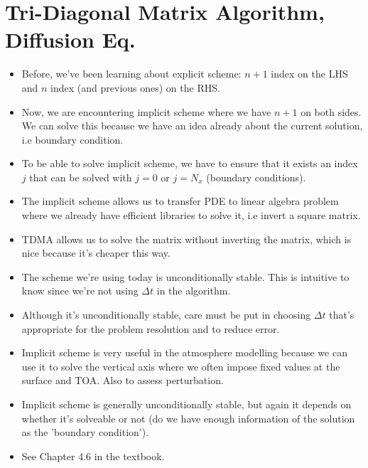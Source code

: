 \documentclass{article}
\begin{document}
\section{Tri-Diagonal Matrix Algorithm, Diffusion Eq.}
\begin{itemize}
    \item Before, we've been learning about explicit scheme: $n+1$ index on the LHS and $n$ index (and previous ones) on the RHS.
    \item Now, we are encountering implicit scheme where we have $n+1$ on both sides. We can solve this because we have an idea already about the current solution, i.e boundary condition.
    \item To be able to solve implicit scheme, we have to ensure that it exists an index $j$ that can be solved with $j=0$ or $j=N_x$ (boundary conditions).
    \item The implicit scheme allows us to transfer PDE to linear algebra problem where we already have efficient libraries to solve it, i.e invert a square matrix.
    \item TDMA allows us to solve the matrix without inverting the matrix, which is nice because it's cheaper this way.
    \item The scheme we're using today is unconditionally stable. This is intuitive to know since we're not using $\Delta t$ in the algorithm.
    \item Although it's unconditionally stable, care must be put in choosing $\Delta t$ that's appropriate for the problem resolution and to reduce error.
    \item Implicit scheme is very useful in the atmosphere modelling because we can use it to solve the vertical axis where we often impose fixed values at the surface and TOA. Also to assess perturbation.
    \item Implicit scheme is generally unconditionally stable, but again it depends on whether it's solveable or not (do we have enough information of the solution as the 'boundary condition').
    \item See Chapter 4.6 in the textbook.
\end{itemize}
\end{document}
